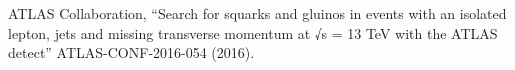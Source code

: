 \begin{thebibliography}{99}
 ATLAS Collaboration, ``Search for squarks and gluinos in events with an isolated lepton, jets and missing transverse momentum at √s = 13 TeV with the ATLAS detect'' ATLAS-CONF-2016-054 (2016).
\end{thebibliography}

%

